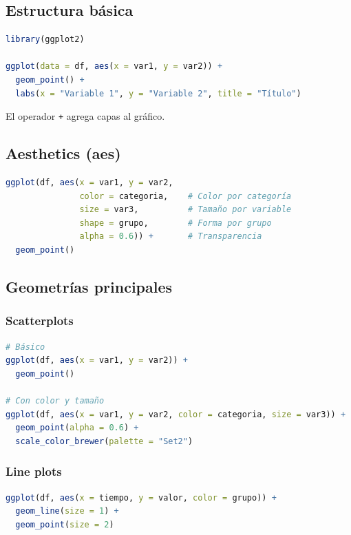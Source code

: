 \documentclass[a4paper,11pt]{article}
\begin{document}
\subsection{Estructura básica}

\begin{lstlisting}[language=R]
library(ggplot2)

ggplot(data = df, aes(x = var1, y = var2)) +
  geom_point() +
  labs(x = "Variable 1", y = "Variable 2", title = "Título")
\end{lstlisting}

El operador \texttt{+} agrega capas al gráfico.

\subsection{Aesthetics (aes)}

\begin{lstlisting}[language=R]
ggplot(df, aes(x = var1, y = var2, 
               color = categoria,    # Color por categoría
               size = var3,          # Tamaño por variable
               shape = grupo,        # Forma por grupo
               alpha = 0.6)) +       # Transparencia
  geom_point()
\end{lstlisting}

\subsection{Geometrías principales}

\subsubsection{Scatterplots}

\begin{lstlisting}[language=R]
# Básico
ggplot(df, aes(x = var1, y = var2)) +
  geom_point()

# Con color y tamaño
ggplot(df, aes(x = var1, y = var2, color = categoria, size = var3)) +
  geom_point(alpha = 0.6) +
  scale_color_brewer(palette = "Set2")
\end{lstlisting}

\subsubsection{Line plots}

\begin{lstlisting}[language=R]
ggplot(df, aes(x = tiempo, y = valor, color = grupo)) +
  geom_line(size = 1) +
  geom_point(size = 2)
\end{lstlisting}
\end{document}
